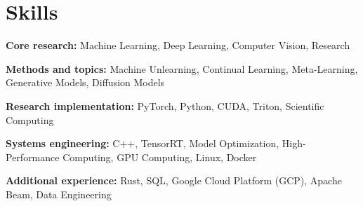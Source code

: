 \documentclass[11pt,a4paper]{article}
\begin{document}
\section*{Skills}
\noindent\textbf{Core research:} Machine Learning, Deep Learning, Computer Vision, Research\par\vspace{1pt}
\noindent\textbf{Methods and topics:} Machine Unlearning, Continual Learning, Meta-Learning, Generative Models, Diffusion Models\par\vspace{1pt}
\noindent\textbf{Research implementation:} PyTorch, Python, CUDA, Triton, Scientific Computing\par\vspace{1pt}
\noindent\textbf{Systems engineering:} C++, TensorRT, Model Optimization, High-Performance Computing, GPU Computing, Linux, Docker\par\vspace{1pt}
\noindent\textbf{Additional experience:} Rust, SQL, Google Cloud Platform (GCP), Apache Beam, Data Engineering\par\vspace{1pt}
\end{document}
